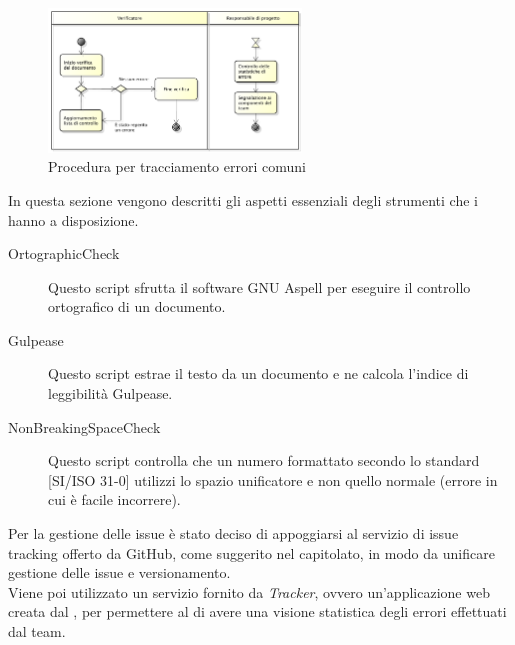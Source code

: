 					\begin{figure}[H]
							\centering
							\includegraphics[width=0.6\textwidth]{NormeDiProgetto/Pics/ProceduraDecrementoErrori}
							\caption{Procedura per tracciamento errori comuni}
					\end{figure}


	\label{sec:strumentiverifica}
			In questa sezione vengono descritti gli aspetti essenziali degli strumenti che i  hanno a disposizione.
			\begin{description}
				\item[OrtographicCheck] Questo script sfrutta il software GNU Aspell per eseguire il controllo ortografico di un documento.
				\item[Gulpease] Questo script estrae il testo da un documento e ne calcola l'indice di leggibilità Gulpease.
				\item[NonBreakingSpaceCheck] Questo script controlla che un numero formattato secondo lo standard [SI/ISO 31-0] utilizzi lo spazio unificatore e non quello normale (errore in cui è facile incorrere).
			\end{description}

			Per la gestione delle issue è stato deciso di appoggiarsi al servizio di issue tracking offerto da GitHub, come suggerito nel capitolato, in modo da unificare gestione delle issue e versionamento. \\
			Viene poi utilizzato un servizio fornito da \textit{Tracker}, ovvero un'applicazione web creata dal \groupname, per permettere al  di avere una visione statistica degli errori effettuati dal team.
